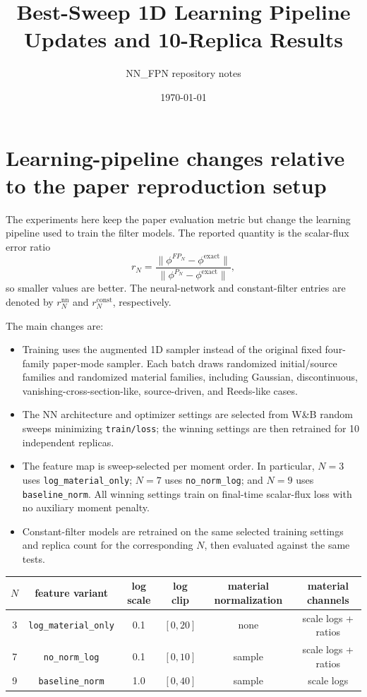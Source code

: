 \documentclass[10pt]{article}
\title{Best-Sweep 1D Learning Pipeline Updates and 10-Replica Results}
\author{NN\_FPN repository notes}
\date{\today}
\newcommand{\rnn}[1]{r_{#1}^{\mathrm{nn}}}
\newcommand{\rconst}[1]{r_{#1}^{\mathrm{const}}}
\begin{document}
\maketitle

\section*{Learning-pipeline changes relative to the paper reproduction setup}
The experiments here keep the paper evaluation metric but change the learning pipeline used to train the filter models.  The reported quantity is the scalar-flux error ratio
\[
  r_N = \frac{\lVert \phi^{FP_N}-\phi^{\mathrm{exact}}\rVert}{\lVert \phi^{P_N}-\phi^{\mathrm{exact}}\rVert},
\]
so smaller values are better.  The neural-network and constant-filter entries are denoted by \(\rnn{N}\) and \(\rconst{N}\), respectively.

The main changes are:
\begin{itemize}
  \item Training uses the augmented 1D sampler instead of the original fixed four-family paper-mode sampler.  Each batch draws randomized initial/source families and randomized material families, including Gaussian, discontinuous, vanishing-cross-section-like, source-driven, and Reeds-like cases.
  \item The NN architecture and optimizer settings are selected from W\&B random sweeps minimizing \texttt{train/loss}; the winning settings are then retrained for 10 independent replicas.
  \item The feature map is sweep-selected per moment order.  In particular, \(N=3\) uses \texttt{log\_material\_only}; \(N=7\) uses \texttt{no\_norm\_log}; and \(N=9\) uses \texttt{baseline\_norm}.  All winning settings train on final-time scalar-flux loss with no auxiliary moment penalty.
  \item Constant-filter models are retrained on the same selected training settings and replica count for the corresponding \(N\), then evaluated against the same tests.
\end{itemize}

\begin{center}
{\scriptsize
\begin{tabular}{c c c c c c}
\toprule
\(N\) & feature variant & log scale & log clip & material normalization & material channels \\
\midrule
3 & \texttt{log\_material\_only} & 0.1 & \([0,20]\) & none & scale logs + ratios \\
7 & \texttt{no\_norm\_log} & 0.1 & \([0,10]\) & sample & scale logs + ratios \\
9 & \texttt{baseline\_norm} & 1.0 & \([0,40]\) & sample & scale logs \\
\bottomrule
\end{tabular}
}
\end{center}
\end{document}
